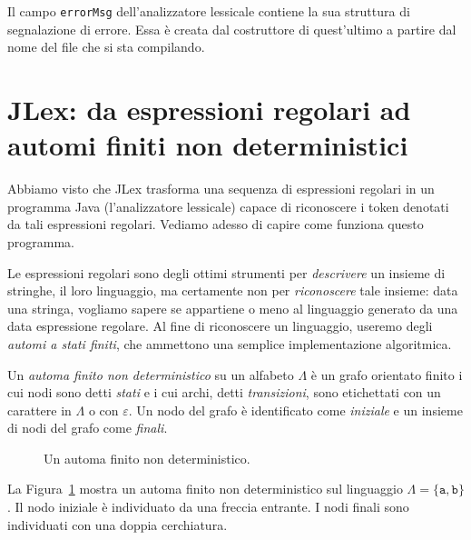 Il campo \texttt{errorMsg} dell'analizzatore lessicale
contiene la sua struttura di segnalazione di errore.
Essa \`e creata dal costruttore di
quest'ultimo a partire dal nome del file che si sta compilando.
%
\section{JLex: da espressioni regolari ad automi finiti non deterministici}
  \label{sec:nfa}
%
Abbiamo visto che JLex trasforma una sequenza di espressioni regolari
in un programma Java (l'analizzatore lessicale)
capace di riconoscere i token denotati da tali
espressioni regolari. Vediamo adesso di capire come funziona questo programma.

Le espressioni regolari sono degli ottimi strumenti per \emph{descrivere}
un insieme di stringhe, il loro linguaggio, ma certamente non per
\emph{riconoscere} tale insieme: data una stringa, vogliamo sapere se
appartiene o meno al linguaggio generato da una data espressione regolare.
Al fine di riconoscere un linguaggio, useremo degli \emph{automi a stati
finiti}, che ammettono una semplice implementazione algoritmica.
%
\begin{definition}\label{def:nfa}
Un \emph{automa finito non deterministico} su un alfabeto $\Lambda$ \`e un
grafo orientato finito i cui nodi sono detti \emph{stati} e i cui archi, detti
\emph{transizioni}, sono etichettati con un carattere in $\Lambda$ o con
$\varepsilon$. Un nodo del grafo \`e identificato come \emph{iniziale}
e un insieme di nodi del grafo come \emph{finali}.
\end{definition}
%
\begin{figure}[t]
\begin{center}
\end{center}
\caption{Un automa finito non deterministico.}\label{fig:nfa}
\end{figure}
%
\noindent
La Figura~\ref{fig:nfa} mostra un automa finito non deterministico
sul linguaggio $\Lambda=\{\mathtt{a},\mathtt{b}\}$. Il nodo iniziale
\`e individuato da una freccia entrante. I nodi finali sono individuati
con una doppia cerchiatura.

